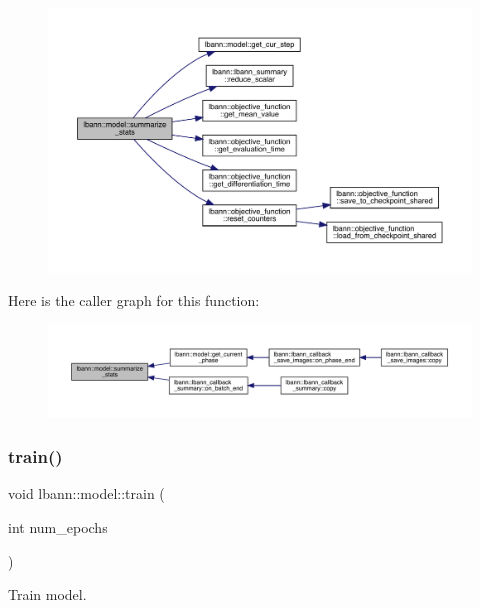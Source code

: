 \begin{figure}[H]
\begin{center}
\leavevmode
\includegraphics[width=350pt]{classlbann_1_1model_a1eb5efcc8f73ba9478b2ce1efb9f2d8c_cgraph}
\end{center}
\end{figure}
Here is the caller graph for this function\+:\nopagebreak
\begin{figure}[H]
\begin{center}
\leavevmode
\includegraphics[width=350pt]{classlbann_1_1model_a1eb5efcc8f73ba9478b2ce1efb9f2d8c_icgraph}
\end{center}
\end{figure}
\mbox{\label{classlbann_1_1model_a11c79dc3783d11b799bdc40ff9c92ddc}} 
\subsubsection{\texorpdfstring{train()}{train()}}
{\footnotesize\ttfamily void lbann\+::model\+::train (\begin{DoxyParamCaption}\item[{int}]{num\+\_\+epochs }\end{DoxyParamCaption})\hspace{0.3cm}{\ttfamily [virtual]}}

Train model. 


